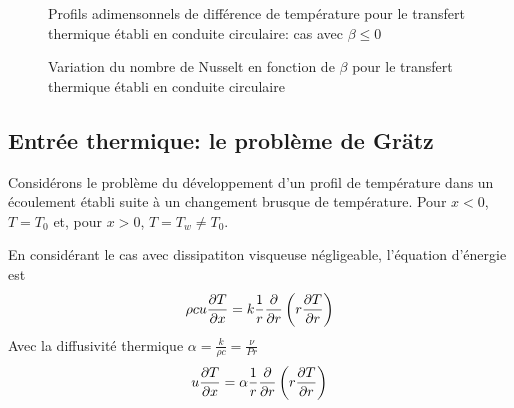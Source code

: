 \documentclass[a4paper,11pt]{report}
\newcommand{\recip}[1]{\frac{1}{#1}}
\begin{document}
      \begin{figure}[!h]
        \centering
        
        \caption{Profils adimensonnels de différence de température pour le transfert thermique établi en conduite circulaire: cas avec $\beta \leq 0$}
        \label{fig:profilDiffTempPos}
      \end{figure}

      \begin{figure}[!h]
        \centering
        
        \caption{Variation du nombre de Nusselt en fonction de $\beta$ pour le transfert thermique établi en conduite circulaire}
        \label{fig:nusseltVar}
      \end{figure}
      
    \subsection{Entrée thermique: le problème de Grätz}
      Considérons le problème du développement d'un profil de température dans un écoulement établi suite à un changement brusque de température. Pour $x<0$, $T=T_0$ et, pour $x>0$, $T=T_w\neq T_0$.


      En considérant le cas avec dissipatiton visqueuse négligeable, l'équation d'énergie est
      \begin{equation}
        \rho c u \pdv{T}{x} = k \recip{r} \pdv{r}\left(r\pdv{T}{r}\right)
      \end{equation}
      Avec la diffusivité thermique $\alpha = \frac{k}{\rho c} = \frac{\nu}{Pr}$
      \begin{equation}
        u \pdv{T}{x} = \alpha \recip{r} \pdv{r}\left(r\pdv{T}{r}\right)
      \end{equation}
\end{document}
